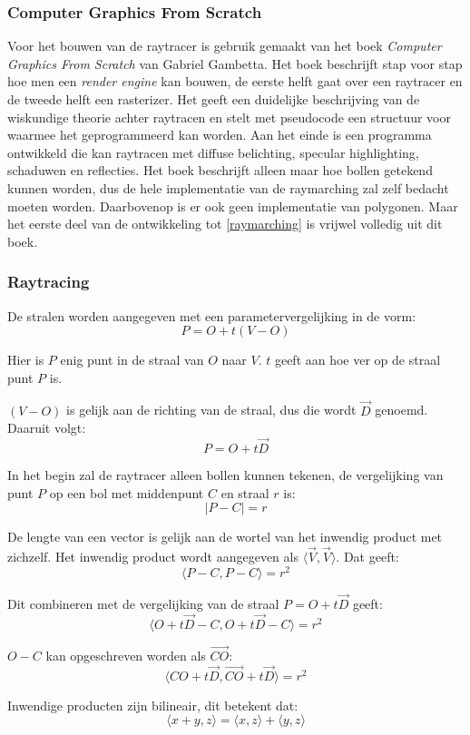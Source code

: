 \documentclass[12pt, a4paper]{article}
\begin{document}
\subsubsection{Computer Graphics From Scratch}
Voor het bouwen van de raytracer is gebruik gemaakt van het boek \emph{Computer Graphics From Scratch} \cite{ComputerGraphicsFromScratch} van Gabriel Gambetta. Het boek beschrijft stap voor stap hoe men een \textit{render engine} kan bouwen, de eerste helft gaat over een raytracer en de tweede helft een rasterizer. Het geeft een duidelijke beschrijving van de wiskundige theorie achter raytracen en stelt met pseudocode een structuur voor waarmee het geprogrammeerd kan worden. Aan het einde is een programma ontwikkeld die kan raytracen met diffuse belichting, specular highlighting, schaduwen en reflecties. Het boek beschrijft alleen maar hoe bollen getekend kunnen worden, dus de hele implementatie van de raymarching zal zelf bedacht moeten worden. Daarbovenop is er ook geen implementatie van polygonen. Maar het eerste deel van de ontwikkeling tot \ref{raymarching} is vrijwel volledig uit dit boek.
\subsubsection{Raytracing}
De stralen worden aangegeven met een parametervergelijking in de vorm:
\[P=O+t(V-O)\]

Hier is $P$ enig punt in de straal van $O$ naar $V$. $t$ geeft aan hoe ver op de straal punt $P$ is.

$(V-O)$ is gelijk aan de richting van de straal, dus die wordt $\vec{D}$ genoemd. Daaruit volgt:
\[P=O+t\vec{D}\]

In het begin zal de raytracer alleen bollen kunnen tekenen, de vergelijking van punt $P$ op een bol met middenpunt $C$ en straal $r$ is:
\[|P-C|=r\]

De lengte van een vector is gelijk aan de wortel van het inwendig product met zichzelf. Het inwendig product wordt aangegeven als $\langle\vec{V},\vec{V} \rangle$. Dat geeft:
\[\langle P-C,P-C\rangle=r^2\]

Dit combineren met de vergelijking van de straal $P=O+t\vec{D}$ geeft:
\[\langle O+t\vec{D}-C,O+t\vec{D}-C\rangle=r^2\]

$O-C$ kan opgeschreven worden als $\vec{CO}$:
\[\langle{CO}+t\vec{D},\vec{CO}+t\vec{D}\rangle=r^2\]

Inwendige producten zijn bilineair, dit betekent dat:
\[\langle x+y,z\rangle=\langle x,z\rangle+\langle y,z\rangle\]
\end{document}
